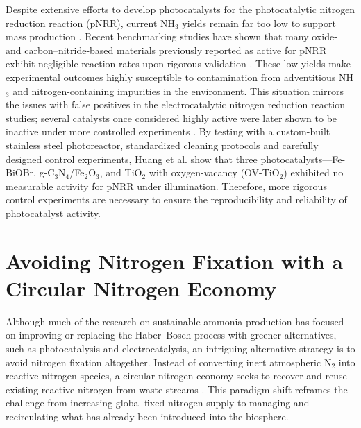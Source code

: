 Despite extensive efforts to develop photocatalysts for the photocatalytic nitrogen reduction reaction (pNRR), current NH$_3$ yields remain far too low to support mass production \cite{Wei2022RecentBeyond}. Recent benchmarking studies have shown that many oxide- and carbon–nitride-based materials previously reported as active for pNRR exhibit negligible reaction rates upon rigorous validation \cite{Huang2024BenchmarkingReaction}. These low yields make experimental outcomes highly susceptible to contamination from adventitious NH$_3$ and nitrogen-containing impurities in the environment. This situation mirrors the issues with false positives in the electrocatalytic nitrogen reduction reaction studies; several catalysts once considered highly active were later shown to be inactive under more controlled experiments \cite{Andersen2019AMeasurements, Choi2022ReassessmentElectroreduction, Hao2022ReplyElectroreduction}. By testing with a custom-built stainless steel photoreactor, standardized cleaning protocols and carefully designed control experiments, Huang et al. show that three photocatalysts—Fe-BiOBr, g-C$_3$N$_4$/Fe$_2$O$_3$, and TiO$_2$ with oxygen-vacancy (OV-TiO$_2$) exhibited no measurable activity for pNRR under illumination. Therefore, more rigorous control experiments are necessary to ensure the reproducibility and reliability of photocatalyst activity.


\section{Avoiding Nitrogen Fixation with a Circular Nitrogen Economy}
Although much of the research on sustainable ammonia production has focused on improving or replacing the Haber–Bosch process with greener alternatives, such as photocatalysis and electrocatalysis, an intriguing alternative strategy is to avoid nitrogen fixation altogether. Instead of converting inert atmospheric N$_2$ into reactive nitrogen species, a circular nitrogen economy seeks to recover and reuse existing reactive nitrogen from waste streams \cite{Botte2024InnovativeRecovery, ChipocoHaro2024ElectrocatalystsConversion, Ferreira-Garcia2025ElectrochemicalEconomy, Okoye2025NitrateProduction, Coyle2025NovelCarbon, AlvarezPugliese2024EfficientElectrodes, Abbasi2024FundamentalsCompound, botte2023methods}. This paradigm shift reframes the challenge from increasing global fixed nitrogen supply to managing and recirculating what has already been introduced into the biosphere.

